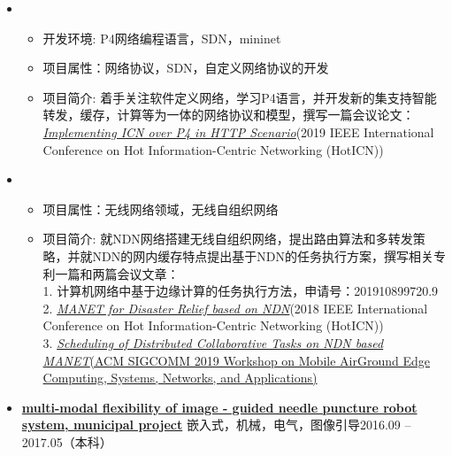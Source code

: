  \begin{itemize}[leftmargin=*]
\item 
{\small
	\begin{itemize}
		\item 开发环境: P4网络编程语言，SDN，mininet
		\item 项目属性：网络协议，SDN，自定义网络协议的开发
		\item 项目简介: 着手关注软件定义网络，学习P4语言，并开发新的集支持智能转发，缓存，计算等为一体的网络协议和模型，撰写一篇会议论文：\\
		\href{https://rec.ustc.edu.cn/share/338739d0-1595-11ea-8267-e347179c193a}{\textit{Implementing ICN over P4 in HTTP Scenario}}(2019 IEEE International Conference on Hot Information-Centric Networking (HotICN))\\
	\end{itemize}
}    
\item 
{\small
   	\begin{itemize}
   		\item 项目属性：无线网络领域，无线自组织网络
   		\item 项目简介: 就NDN网络搭建无线自组织网络，提出路由算法和多转发策略，并就NDN的网内缓存特点提出基于NDN的任务执行方案，撰写相关专利一篇和两篇会议文章：\\
   		1. 计算机网络中基于边缘计算的任务执行方法，申请号：201910899720.9 \\
   		2. \href{https://ieeexplore.ieee.org/document/8605969} {\textit{MANET for Disaster Relief based on NDN}}(2018 IEEE International Conference on Hot Information-Centric Networking (HotICN))\\
   		3. \href{https://dl.acm.org/citation.cfm?doid=3341568.3342110}{\textit{Scheduling of Distributed Collaborative Tasks on NDN based MANET}(ACM SIGCOMM 2019 Workshop on Mobile Air­Ground Edge Computing, Systems, Networks, and Applications)}
   	\end{itemize}
}
\item
  \href{https://upload-images.jianshu.io/upload_images/15436989-3949bacbca4e82e4.JPG?imageMogr2/auto-orient/strip%7CimageView2/2/w/1240}{\textbf{multi-modal flexibility of image - guided needle puncture robot system, municipal project}}
  \ressubsingleline{} {嵌入式，机械，电气，图像引导}{2016.09 -- 2017.05（本科）}
 

\end{itemize}
